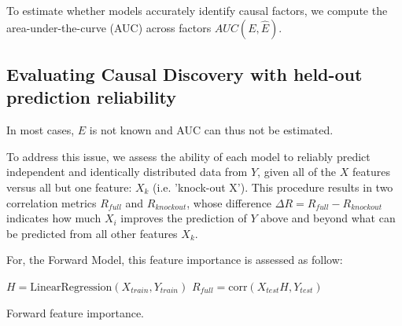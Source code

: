 To estimate whether models accurately identify causal factors, we compute the
area-under-the-curve (AUC) across factors $AUC(E, \hat E)$.

\subsection{Evaluating Causal Discovery with held-out prediction reliability}

In most cases, $E$ is not known and AUC can thus not be estimated.

To address this issue, we assess the ability of each model to reliably predict
independent and identically distributed data from $Y$, given all of the $X$
features versus all but one feature: $X_k$ (i.e. 'knock-out X'). This procedure
results in two correlation metrics $R_{full}$ and $R_{knockout}$, whose
difference $\Delta R=R_{full}-R_{knockout}$ indicates how much $X_i$ improves
the prediction of $Y$ above and beyond what can be predicted from all other
features $X_k$.

For, the Forward Model, this feature importance is assessed as follow:

\begin{algorithm}[H]
      $H = \text{LinearRegression}(X_{train},
Y_{train})$\; $R_{full} = \text{corr}(X_{test} H, Y_{test})$\;

     
\caption{Forward feature importance.} \label{algorithm:fwd_fi} \end{algorithm}


